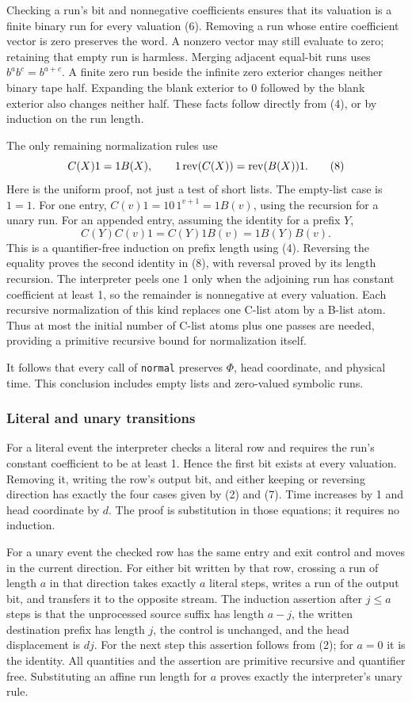 Checking a run's bit and nonnegative coefficients ensures that its
valuation is a finite binary run for every valuation (6).  Removing a run
whose entire coefficient vector is zero preserves the word.  A nonzero
vector may still evaluate to zero; retaining that empty run is harmless.
Merging adjacent equal-bit runs uses $b^a b^c=b^{a+c}$.  A finite zero run
beside the infinite zero exterior changes neither binary tape half.
Expanding the blank exterior to $0$ followed by the blank exterior also
changes neither half.  These facts follow directly from (4), or by
induction on the run length.

The only remaining normalization rules use
\[
 C(X)1=1B(X),\qquad 1\operatorname{rev}(C(X))=\operatorname{rev}(B(X))1.                     \tag{8}
\]
Here is the uniform proof, not just a test of short lists.  The empty-list
case is $1=1$.  For one entry,
$C(v)1=10\,1^{v+1}=1B(v)$, using the recursion for a unary run.  For an
appended entry, assuming the identity for a prefix $Y$,
\[
 C(Y)C(v)1=C(Y)1B(v)=1B(Y)B(v).
\]
This is a quantifier-free induction on prefix length using (4).  Reversing
the equality proves the second identity in (8), with reversal proved by
its length recursion.  The interpreter peels one 1 only when the adjoining
run has constant coefficient at least 1, so the remainder is nonnegative
at every valuation.  Each recursive normalization of this kind replaces
one C-list atom by a B-list atom.  Thus at most the initial number of
C-list atoms plus one passes are needed, providing a primitive recursive
bound for normalization itself.

It follows that every call of \texttt{normal} preserves $\Phi$, head
coordinate, and physical time.  This conclusion includes empty lists and
zero-valued symbolic runs.

\subsubsection{Literal and unary transitions}

For a literal event the interpreter checks a literal row and requires
the run's constant coefficient to be at least 1.  Hence the first bit
exists at every valuation.  Removing it, writing the row's output bit,
and either keeping or reversing direction has exactly the four cases
given by (2) and (7).  Time increases by 1 and head coordinate by $d$.
The proof is substitution in those equations; it requires no induction.

For a unary event the checked row has the same entry and exit control
and moves in the current direction.  For either bit written by that row,
crossing a run of length $a$ in that direction takes exactly $a$ literal
steps, writes a run of the output bit, and transfers it to the opposite
stream.  The induction assertion after $j\leq a$ steps is that the
unprocessed source suffix has length $a-j$, the written destination
prefix has length $j$, the control is unchanged, and the head displacement
is $dj$.  For the next step this assertion follows from (2); for $a=0$
it is the identity.  All quantities and the assertion are primitive
recursive and quantifier free.  Substituting an affine run length for
$a$ proves exactly the interpreter's unary rule.

